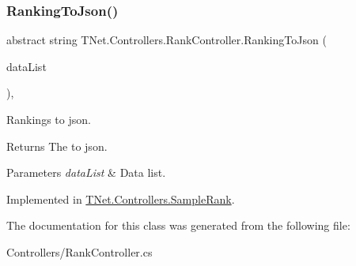 \subsubsection{\texorpdfstring{Ranking\+To\+Json()}{RankingToJson()}}
{\footnotesize\ttfamily abstract string T\+Net.\+Controllers.\+Rank\+Controller.\+Ranking\+To\+Json (\begin{DoxyParamCaption}\item[{I\+List$<$ object $>$}]{data\+List }\end{DoxyParamCaption})\hspace{0.3cm}{\ttfamily [protected]}, {}}



Rankings to json. 

\begin{DoxyReturn}{Returns}
The to json.
\end{DoxyReturn}

\begin{DoxyParams}{Parameters}
{\em data\+List} & Data list.\\
\hline
\end{DoxyParams}


Implemented in \mbox{\hyperlink{class_t_net_1_1_controllers_1_1_sample_rank_ae6bc5f73a0068ef27537e742cbff29be}{T\+Net.\+Controllers.\+Sample\+Rank}}.



The documentation for this class was generated from the following file\+:\begin{DoxyCompactItemize}
\item 
Controllers/Rank\+Controller.\+cs\end{DoxyCompactItemize}
